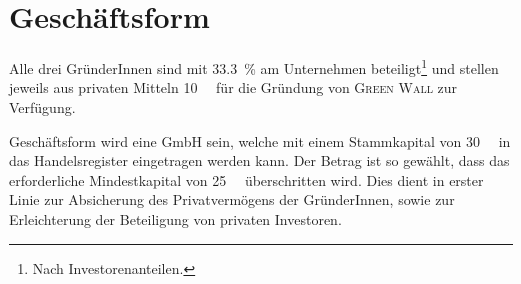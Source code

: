     \section{Geschäftsform}

    Alle drei GründerInnen sind mit \qty{33.3}{\percent} am Unternehmen beteiligt\footnote{Nach Investorenanteilen.} und stellen jeweils aus privaten Mitteln \qty{10}{\kilo\EUR} für die Gründung von \textsc{Green Wall} zur Verfügung.

    Geschäftsform wird eine GmbH sein, welche mit einem Stammkapital von \qty{30}{\kilo\EUR} in das Handelsregister eingetragen werden kann. 
    Der Betrag ist so gewählt, dass das erforderliche Mindestkapital von \qty{25}{\kilo\EUR} überschritten wird. 
    Dies dient in erster Linie zur Absicherung des Privatvermögens der GründerInnen, sowie zur Erleichterung der Beteiligung von privaten Investoren. 
    